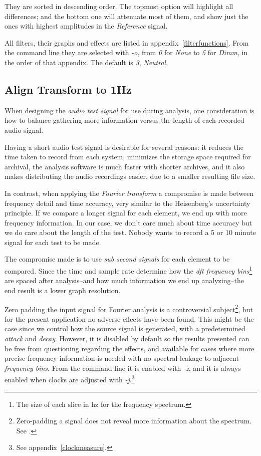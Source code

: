 \documentclass[10pt,a4paper]{report}
\newcommand{\ac}[1]{\textit{\mbox{\acrshort{#1}}}}
\begin{document}
\begin{appendices}
They are sorted in descending order. The topmost option will highlight all differences; and the bottom one will attenuate most of them, and show just the ones with highest amplitudes in the \textit{Reference} signal.

All filters, their graphs and effects are listed in appendix~\ref{filterfunctions}. From the command line they are selected with \textit{-o}, from \textit{0} for \textit{None} to \textit{5} for \textit{Dimm}, in the order of that appendix. The default is \textit{3}, \textit{Neutral}.

\subsection{Align Transform to 1Hz}

When designing the \textit{audio test signal} for use during analysis, one consideration is how to balance gathering more information versus the length of each recorded audio signal. 

Having a short audio test signal is desirable for several reasons: it reduces the time taken to record from each system, minimizes the storage space required for archival, the analysis software is much faster with shorter archives, and it also makes distributing the audio recordings easier, due to a smaller resulting file size.

In contrast, when applying the \textit{Fourier transform} a compromise is made between frequency detail and time accuracy, very similar to the Heisenberg's uncertainty principle. If we compare a longer signal for each element, we end up with more frequency information. In our case, we don't care much about time accuracy but we do care about the length of the test. Nobody wants to record a 5 or 10 minute signal for each test to be made.

The compromise made is to use \textit{sub second signals} for each element to be compared. Since the time and sample rate determine how the \ac{dft} \textit{frequency bins}\footnote{The size of each slice in \acrlong{hz} for the frequency spectrum.} are spaced after analysis--and how much information we end up analyzing--the end result is a lower graph resolution.

Zero padding the input signal for Fourier analysis is a controversial subject\footnote{Zero-padding a signal does not reveal more information about the spectrum. See \cite{zeropaddinginterpolate} \cite{ZeroPaddingBad}.}, but for the present application no adverse effects have been found. This might be the case since we control how the source signal is generated, with a predetermined \textit{attack} and \textit{decay}. However, it is disabled by default so the results presented can be free from questioning regarding the effects, and available for cases where more precise frequency information is needed with no spectral leakage to adjacent \textit{frequency bins}. From the command line it is enabled with \textit{-z}, and it is always enabled when clocks are adjusted with \textit{-j}.\footnote{See appendix~\ref{clockmeasure}.}


\end{appendices}
\end{document}
